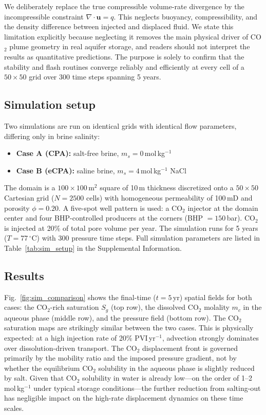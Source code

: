 \documentclass[preprint,12pt,authoryear]{elsarticle}
\begin{document}
We deliberately replace the true compressible volume-rate divergence by the
incompressible constraint $\nabla\cdot\mathbf{u} = q$.
This neglects buoyancy, compressibility, and the density difference between injected and
displaced fluid.
We state this limitation explicitly because neglecting it removes the main physical driver
of CO$_2$ plume geometry in real aquifer storage, and readers should not interpret the
results as quantitative predictions.
The purpose is solely to confirm that the stability and flash routines converge reliably
and efficiently at every cell of a $50{\times}50$ grid over 300 time steps spanning 5 years.

\subsection{Simulation setup}
\label{sec:sim_setup}

Two simulations are run on identical grids with identical flow parameters, differing only
in brine salinity:
\begin{itemize}
  \item \textbf{Case A (CPA):} salt-free brine, $m_s = 0$\,mol\,kg$^{-1}$
  \item \textbf{Case B (eCPA):} saline brine, $m_s = 4$\,mol\,kg$^{-1}$ NaCl
\end{itemize}
The domain is a $100\times100$\,m$^2$ square of 10\,m thickness discretized onto a
$50\times50$ Cartesian grid ($N = 2500$ cells) with homogeneous permeability of 100\,mD
and porosity $\phi = 0.20$.
A five-spot well pattern is used: a CO$_2$ injector at the domain center and four
BHP-controlled producers at the corners (BHP $= 150$\,bar).
CO$_2$ is injected at 20\% of total pore volume per year.
The simulation runs for 5 years ($T = 77\,^\circ$C) with 300 pressure time steps.
Full simulation parameters are listed in Table~\ref{tab:sim_setup} in the Supplemental
Information.

\subsection{Results}
\label{sec:sim_results}

Fig.~\ref{fig:sim_comparison} shows the final-time ($t = 5$\,yr) spatial fields for
both cases: the CO$_2$-rich saturation $S_g$ (top row), the dissolved CO$_2$ molality
$m_c$ in the aqueous phase (middle row), and the pressure field (bottom row).
The CO$_2$ saturation maps are strikingly similar between the two cases.
This is physically expected: at a high injection rate of 20\% PVI\,yr$^{-1}$, advection
strongly dominates over dissolution-driven transport.
The CO$_2$ displacement front is governed primarily by the mobility ratio and the
imposed pressure gradient, not by whether the equilibrium CO$_2$ solubility in the
aqueous phase is slightly reduced by salt.
Given that CO$_2$ solubility in water is already low---on the order of 1--2\,mol\,kg$^{-1}$
under typical storage conditions---the further reduction from salting-out has negligible
impact on the high-rate displacement dynamics on these time scales.
\end{document}
